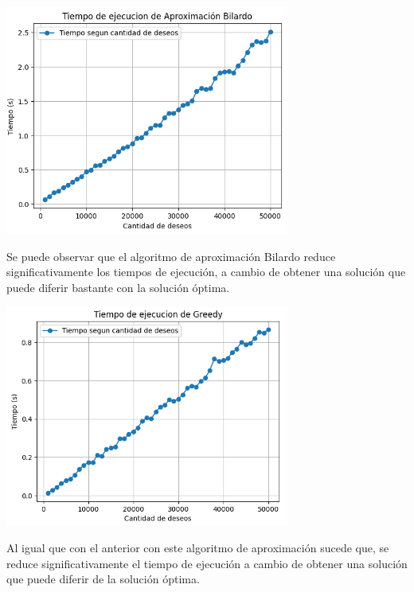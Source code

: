 \documentclass{estilo}
\begin{document}
\begin{center}
\includegraphics[width=0.7\textwidth]{img/tiempo_bilardo.png}

Se puede observar que el algoritmo de aproximación Bilardo reduce significativamente los tiempos de ejecución, a cambio de obtener una solución que puede diferir bastante con la solución óptima.
\end{center}

\begin{center}
\includegraphics[width=0.7\textwidth]{img/tiempo_greedy.png}

Al igual que con el anterior con este algoritmo de aproximación sucede que, se reduce significativamente el tiempo de ejecución a cambio de obtener una solución que puede diferir de la solución óptima.
\end{center}
\end{document}
